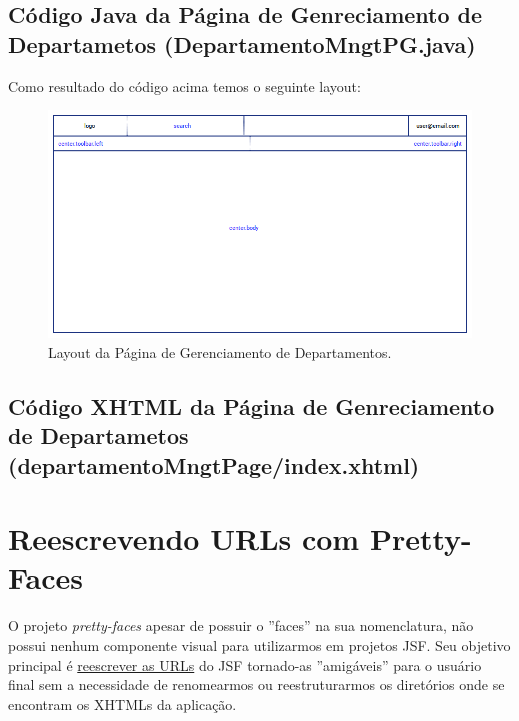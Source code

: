 \documentclass[a4paper,10pt]{article}
\begin{document}
\subsection{Código Java da Página de Genreciamento de Departametos
(DepartamentoMngtPG.java)} 
	
Como resultado do código acima temos o seguinte layout:
	\begin{figure}[h]
		\centering
	 	\includegraphics[scale=.6]{images/layoutDepartamentoMngtPage.png} 
	 	\caption{Layout da Página de Gerenciamento de Departamentos.}
	\end{figure}
	
% 
%
\newpage
\subsection{Código XHTML da Página de Genreciamento de Departametos
(departamentoMngtPage/index.xhtml)} 
 
% 
%
\section{Reescrevendo URLs com Pretty-Faces}
O projeto \emph{pretty-faces}  apesar de possuir o ''faces'' na sua
nomenclatura, não possui nenhum componente visual para utilizarmos em projetos
JSF. Seu objetivo principal é \underline{reescrever as URLs} do JSF tornado-as
''amigáveis'' para o usuário final sem a necessidade de renomearmos ou
reestruturarmos os diretórios onde se encontram os XHTMLs da aplicação.
% 
%
\end{document}
